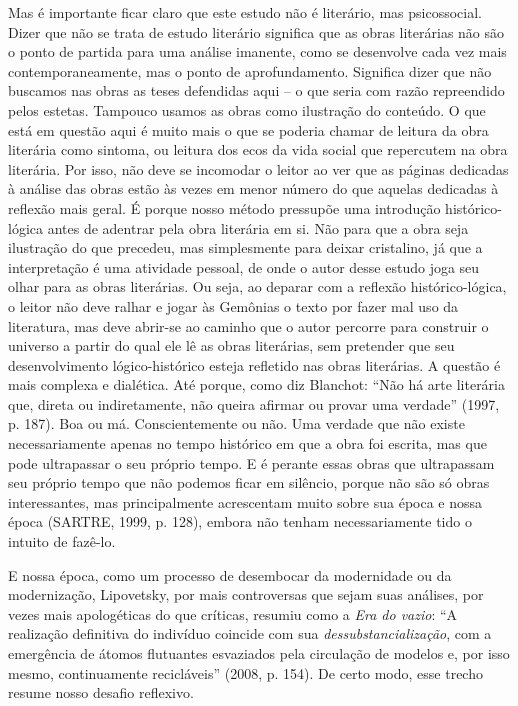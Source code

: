 Mas é importante ficar claro que este estudo não é literário, mas
psicossocial. Dizer que não se trata de estudo literário significa que
as obras literárias não são o ponto de partida para uma análise
imanente, como se desenvolve cada vez mais contemporaneamente, mas o
ponto de aprofundamento. Significa dizer que não buscamos nas obras as
teses defendidas aqui -- o que seria com razão repreendido pelos
estetas. Tampouco usamos as obras como ilustração do conteúdo. O que
está em questão aqui é muito mais o que se poderia chamar de leitura da
obra literária como sintoma, ou leitura dos ecos da vida social que
repercutem na obra literária. Por isso, não deve se incomodar o leitor
ao ver que as páginas dedicadas à análise das obras estão às vezes em
menor número do que aquelas dedicadas à reflexão mais geral. É porque
nosso método pressupõe uma introdução histórico-lógica antes de adentrar
pela obra literária em si. Não para que a obra seja ilustração do que
precedeu, mas simplesmente para deixar cristalino, já que a
interpretação é uma atividade pessoal, de onde o autor desse estudo joga
seu olhar para as obras literárias. Ou seja, ao deparar com a reflexão
histórico-lógica, o leitor não deve ralhar e jogar às Gemônias o texto
por fazer mal uso da literatura, mas deve abrir-se ao caminho que o
autor percorre para construir o universo a partir do qual ele lê as
obras literárias, sem pretender que seu desenvolvimento lógico-histórico
esteja refletido nas obras literárias. A questão é mais complexa e
dialética. Até porque, como diz Blanchot: ``Não há arte literária que,
direta ou indiretamente, não queira afirmar ou provar uma verdade''
(1997, p. 187). Boa ou má. Conscientemente ou não. Uma verdade que não
existe necessariamente apenas no tempo histórico em que a obra foi
escrita, mas que pode ultrapassar o seu próprio tempo. E é perante essas
obras que ultrapassam seu próprio tempo que não podemos ficar em
silêncio, porque não são só obras interessantes, mas principalmente
acrescentam muito sobre sua época e nossa época (SARTRE, 1999, p. 128),
embora não tenham necessariamente tido o intuito de fazê-lo.

E nossa época, como um processo de desembocar da modernidade ou da
modernização, Lipovetsky, por mais controversas que sejam suas análises,
por vezes mais apologéticas do que críticas, resumiu como a \emph{Era do
vazio}: ``A realização definitiva do indivíduo coincide com sua
\emph{dessubstancialização}, com a emergência de átomos flutuantes
esvaziados pela circulação de modelos e, por isso mesmo, continuamente
recicláveis'' (2008, p. 154). De certo modo, esse trecho resume nosso
desafio reflexivo.

